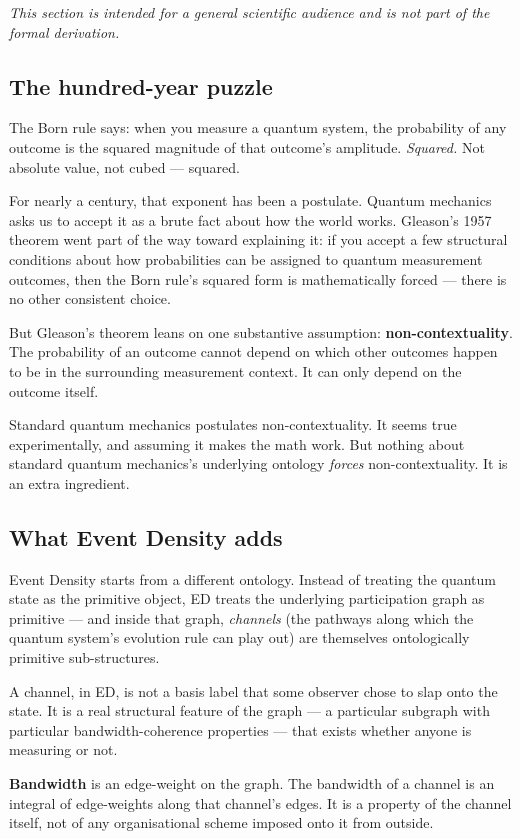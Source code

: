 \documentclass[11pt,a4paper]{article}
\begin{document}
\emph{This section is intended for a general scientific audience and is not part of the formal derivation.}

\subsection{The hundred-year puzzle}

The Born rule says: when you measure a quantum system, the probability of any outcome is the squared magnitude of that outcome's amplitude. \emph{Squared.} Not absolute value, not cubed --- squared.

For nearly a century, that exponent has been a postulate. Quantum mechanics asks us to accept it as a brute fact about how the world works. Gleason's 1957 theorem went part of the way toward explaining it: if you accept a few structural conditions about how probabilities can be assigned to quantum measurement outcomes, then the Born rule's squared form is mathematically forced --- there is no other consistent choice.

But Gleason's theorem leans on one substantive assumption: \textbf{non-contextuality}. The probability of an outcome cannot depend on which other outcomes happen to be in the surrounding measurement context. It can only depend on the outcome itself.

Standard quantum mechanics postulates non-contextuality. It seems true experimentally, and assuming it makes the math work. But nothing about standard quantum mechanics's underlying ontology \emph{forces} non-contextuality. It is an extra ingredient.

\subsection{What Event Density adds}

Event Density starts from a different ontology. Instead of treating the quantum state as the primitive object, ED treats the underlying participation graph as primitive --- and inside that graph, \emph{channels} (the pathways along which the quantum system's evolution rule can play out) are themselves ontologically primitive sub-structures.

A channel, in ED, is not a basis label that some observer chose to slap onto the state. It is a real structural feature of the graph --- a particular subgraph with particular bandwidth-coherence properties --- that exists whether anyone is measuring or not.

\textbf{Bandwidth} is an edge-weight on the graph. The bandwidth of a channel is an integral of edge-weights along that channel's edges. It is a property of the channel itself, not of any organisational scheme imposed onto it from outside.
\end{document}

